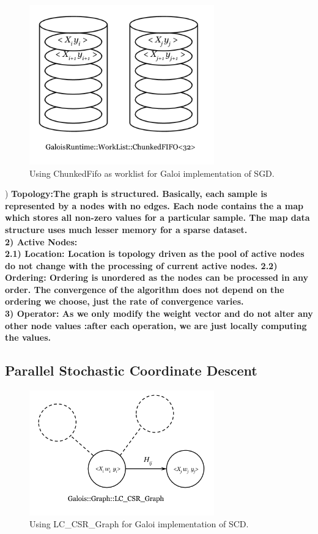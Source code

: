 \documentclass{sigplanconf}
\begin{document}
\begin{figure}[ht!]
\centering
\includegraphics[width=80mm]{chunked_fifo.png}
\caption{Using ChunkedFifo as worklist for Galoi implementation of SGD.}
\label{overflow}
\end{figure}
) \bf{Topology}:\rm The graph is structured. Basically, each sample is represented by a nodes with no edges. Each node contains the
a map which stores all non-zero values for a particular sample. The map data structure uses much lesser memory for a sparse dataset. \\
2) \bf{Active Nodes}:\\\rm
2.1) \bf{Location}: \rm Location is topology driven as the pool of active nodes do not change with the
processing of current active nodes.
2.2) \bf{Ordering}: \rm Ordering is unordered as the nodes can be processed in any order. The convergence of the algorithm does not depend on the ordering we choose, just the rate of convergence varies.\\
3) \bf{Operator}: \rm As we only modify the weight vector and do not alter any other node values :after each operation, we are just
locally computing the values.

\rm
\subsection{Parallel Stochastic Coordinate Descent}

\begin{figure}[ht!]
\centering
\includegraphics[width=80mm]{lc_scr_graph.png}
\caption{Using LC\_CSR\_Graph for Galoi implementation of SCD.}
\label{overflow}
\end{figure}
\end{document}

